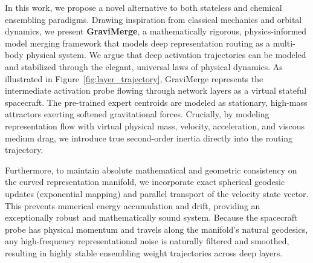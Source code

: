 In this work, we propose a novel alternative to both stateless and chemical ensembling paradigms. Drawing inspiration from classical mechanics and orbital dynamics, we present \textbf{GraviMerge}, a mathematically rigorous, physics-informed model merging framework that models deep representation routing as a multi-body physical system. We argue that deep activation trajectories can be modeled and stabilized through the elegant, universal laws of physical dynamics. As illustrated in Figure~\ref{fig:layer_trajectory}, GraviMerge represents the intermediate activation probe flowing through network layers as a virtual stateful spacecraft. The pre-trained expert centroids are modeled as stationary, high-mass attractors exerting softened gravitational forces. Crucially, by modeling representation flow with virtual physical mass, velocity, acceleration, and viscous medium drag, we introduce true second-order inertia directly into the routing trajectory. 

Furthermore, to maintain absolute mathematical and geometric consistency on the curved representation manifold, we incorporate exact spherical geodesic updates (exponential mapping) and parallel transport of the velocity state vector. This prevents numerical energy accumulation and drift, providing an exceptionally robust and mathematically sound system. Because the spacecraft probe has physical momentum and travels along the manifold's natural geodesics, any high-frequency representational noise is naturally filtered and smoothed, resulting in highly stable ensembling weight trajectories across deep layers.

